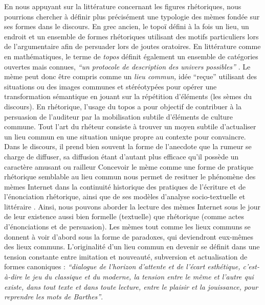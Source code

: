 En nous appuyant sur la littérature concernant les figures rhétoriques, nous pourrions chercher à définir plus précisément une typologie des mèmes fondée sur ses formes dans le discours. En grec ancien, le topo\"i défini à la fois un lieu, un endroit et un ensemble de formes rhétoriques utilisant des motifs particuliers lors de l{\textquoteright}argumentaire afin de persuader lors de joutes oratoires. En littérature comme en mathématiques, le terme de \textit{topos} définit également un ensemble de catégories ouvertes mais connues, \textit{{\textquotedblleft}un protocole de description des univers possibles{\textquotedblright} }\citep{Badiou2006}. Le mème peut donc être compris comme un \textit{lieu commun, }idée {\textquotedblleft}re\c{c}ue{\textquotedblright} utilisant des situations ou des images communes et stéréotypées pour opérer une transformation sémantique en jouant sur la répétition d'éléments (les sèmes du discours). En rhétorique, l{\textquoteright}usage du topos a pour objectif de contribuer à la persuasion de l{\textquoteright}auditeur par la mobilisation subtile d{\textquoteright}éléments de culture commune. Tout l{\textquoteright}art du rhéteur consiste à trouver un moyen subtile d{\textquoteright}actualiser un lieu commun en une situation unique propre au contexte pour convaincre. Dans le discours, il prend bien souvent la forme de l{\textquoteright}anecdote que la rumeur se charge de diffuser, sa diffusion étant d{\textquoteright}autant plus efficace qu{\textquoteright}il possède un caractère amusant ou railleur \citep{Flaubert1997} Concevoir le mème comme une forme de pratique rhétorique semblable au lieu commun nous permet de resituer le phénomène des mèmes Internet dans la continuité historique des pratiques de l{\textquoteright}écriture et de l{\textquoteright}énonciation rhétorique, ainsi que de ses modèles d{\textquoteright}analyse socio-textuelle et littéraire \citep{Plantin1993}. Ainsi, nous pouvons aborder la lecture des mèmes Internet sous le jour de leur existence aussi bien formelle (textuelle) que rhétorique (comme actes d{\textquoteright}énonciations et de persuasion). Les mèmes tout comme les lieux communs se donnent à voir d{\textquoteright}abord sous la forme de paradoxes, qui deviendront eux-mêmes des lieux communs. L{\textquoteright}originalité d{\textquoteright}un lieu commun en devenir se définit dans une tension constante entre imitation et nouveauté, subversion et actualisation de formes canoniques : \textit{``dialogue de l'horizon d'attente et de l'écart esthétique, c'est-à-dire le jeu du classique et du moderne, la tension entre le même et l'autre qui existe, dans tout texte et dans toute lecture, entre le plaisir et la jouissance, pour reprendre les mots de Barthes''}. \citep{Compagnon1997} 

